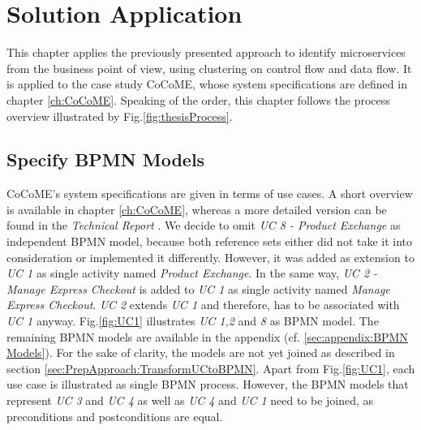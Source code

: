 \chapter{Solution Application}
\label{ch:SolutionApplication}
This chapter applies the previously presented approach to identify microservices from the business point of view, using clustering on control flow and data flow. It is applied to the case study CoCoME, whose system specifications are defined in chapter \ref{ch:CoCoME}. Speaking of the order, this chapter follows the process overview illustrated by Fig.\ref{fig:thesisProcess}.

\section{Specify BPMN Models}
CoCoME's system specifications are given in terms of use cases. A short overview is available in chapter \ref{ch:CoCoME}, whereas a more detailed version can be found in the \textit{Technical Report} \cite{CoCoMETechnical}. We decide to omit  \textit{UC 8 - Product Exchange} as independent BPMN model, because both reference sets either did not take it into consideration or implemented it differently. However, it was added as extension to \textit{UC 1} as single activity named \textit{Product Exchange}. In the same way, \textit{UC 2 - Manage Express Checkout} is added to \textit{UC 1} as single activity named \textit{Manage Express Checkout}. \textit{UC 2} extends \textit{UC 1} and therefore, has to be associated with \textit{UC 1} anyway.  Fig.\ref{fig:UC1} illustrates \textit{UC 1,2} and \textit{8} as BPMN model. The remaining BPMN models are available in the appendix (cf. \ref{sec:appendix:BPMN Models}). For the sake of clarity, the models are not yet joined as described in section \ref{sec:PrepApproach:TransformUCtoBPMN}. Apart from Fig.\ref{fig:UC1}, each use case is illustrated as single BPMN process. However, the BPMN models that represent \textit{UC 3} and \textit{UC 4} as well as \textit{UC 4} and \textit{UC 1} need to be joined, as preconditions and postconditions are equal. 



